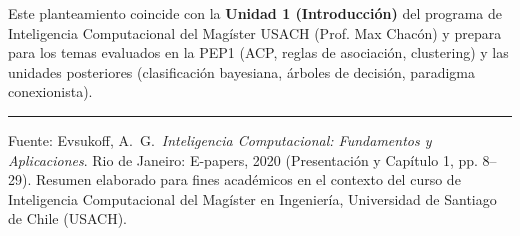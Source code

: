 \documentclass[11pt,a4paper]{article}
\begin{document}
Este planteamiento coincide con la \textbf{Unidad 1 (Introducción)} del programa de
Inteligencia Computacional del Magíster USACH (Prof. Max Chacón) y prepara para los
temas evaluados en la PEP1 (ACP, reglas de asociación, clustering) y las unidades
posteriores (clasificación bayesiana, árboles de decisión, paradigma conexionista).

\vspace{0.4em}
\hrule
\vspace{0.3em}
{\footnotesize Fuente: Evsukoff, A.\ G.\ \emph{Inteligencia Computacional: Fundamentos y
Aplicaciones}. Rio de Janeiro: E-papers, 2020 (Presentación y Capítulo 1, pp. 8--29).
Resumen elaborado para fines académicos en el contexto del curso de Inteligencia
Computacional del Magíster en Ingeniería, Universidad de Santiago de Chile (USACH).}
\end{document}
